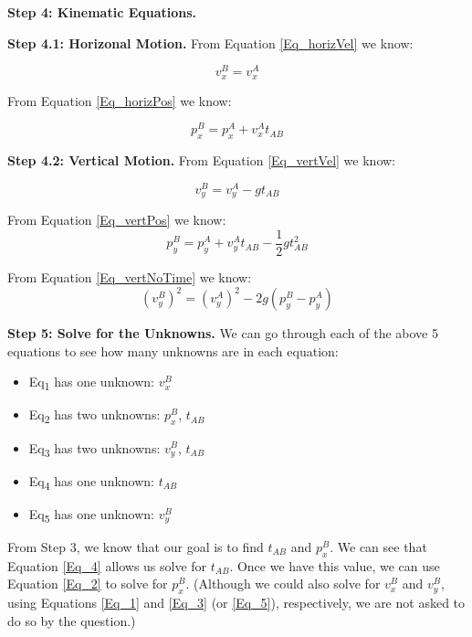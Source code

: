 \documentclass[11pt]{article}
\begin{document}
\textbf{Step 4: Kinematic Equations.}

\textbf{Step 4.1: Horizonal Motion.} From Equation \ref{Eq_horizVel} we know:

\begin{equation}
\label{Eq_1}
v_x^B = v_x^A
\end{equation}

From Equation \ref{Eq_horizPos} we know:

\begin{equation}
\label{Eq_2}
p_x^B = p_x^A + v_x^A t_{AB}
\end{equation}

\textbf{Step 4.2: Vertical Motion.} From Equation \ref{Eq_vertVel} we know:

\begin{equation}
\label{Eq_3}
v_y^B = v_y^A - g t_{AB}
\end{equation}

From Equation \ref{Eq_vertPos} we know:
\begin{equation}
\label{Eq_4}
p_y^B = p_y^A + v_y^A t_{AB} - \frac{1}{2} g t_{AB}^2
\end{equation}

From Equation \ref{Eq_vertNoTime} we know:
\begin{equation}
\label{Eq_5}
(v_y^B)^2 = (v_y^A)^2 - 2 g ( p_y^B - p_y^A)
\end{equation}

\textbf{Step 5: Solve for the Unknowns.} We can go through each of the above
5 equations to see how many unknowns are in each equation:

\begin{itemize}
\item Eq\textsubscript{1} has one unknown: \(v_x^B\)
\item Eq\textsubscript{2} has two unknowns: \(p_x^B\), \(t_{AB}\)
\item Eq\textsubscript{3} has two unknowns: \(v_y^B\), \(t_{AB}\)
\item Eq\textsubscript{4} has one unknown: \(t_{AB}\)
\item Eq\textsubscript{5} has one unknown: \(v_y^B\)
\end{itemize}

From Step 3, we know that our goal is to find \(t_{AB}\) and \(p_x^B\).
We can see that Equation \ref{Eq_4} allows us solve for \(t_{AB}\).
Once we have this value, we can use Equation \ref{Eq_2} to solve for
\(p_x^B\).  (Although we could also solve for \(v_x^B\) and \(v_y^B\), using
Equations \ref{Eq_1} and \ref{Eq_3} (or \ref{Eq_5}), respectively, we
are not asked to do so by the question.)
\end{document}
